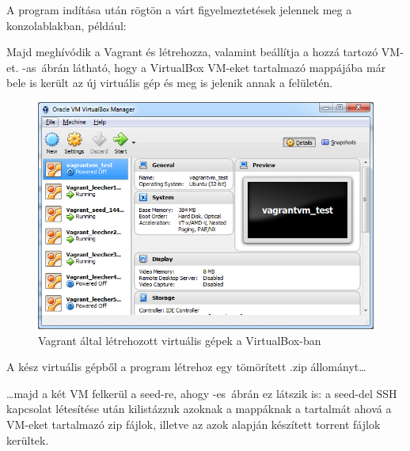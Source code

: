 A program indítása után rögtön a várt figyelmeztetések jelennek meg a konzolablakban, például:


Majd meghívódik a Vagrant és létrehozza, valamint beállítja a hozzá tartozó VM-et. -as~ábrán látható, hogy a VirtualBox VM-eket tartalmazó mappájába már bele is került az új virtuális gép és meg is jelenik annak a felületén.

\begin{figure}[ht]
\centering
\includegraphics[width=140mm, keepaspectratio]{figures/test_vbox.png}
\caption{Vagrant által létrehozott virtuális gépek a VirtualBox-ban}
\label{fig:vboxcap}
\end{figure}
A kész virtuális gépből a program létrehoz egy tömörített .zip állományt\ldots


\ldots majd a két VM felkerül a seed-re, ahogy -es~ábrán ez látszik is:  a seed-del SSH kapcsolat létesítése után kilistázzuk azoknak a mappáknak a tartalmát ahová a VM-eket tartalmazó zip fájlok, illetve az azok alapján készített torrent fájlok kerültek.

